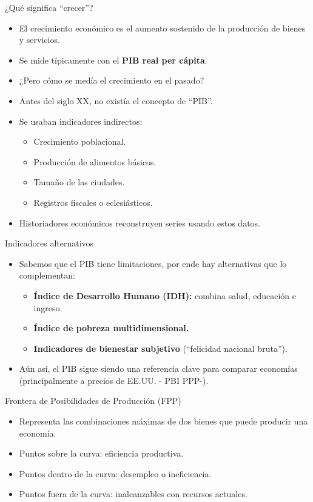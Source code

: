 \documentclass{beamer}
\begin{document}
\begin{frame}{¿Qué significa “crecer”?}
    \begin{itemize}
        \item El crecimiento económico es el aumento sostenido de la producción de bienes y servicios.
        \item Se mide típicamente con el \textbf{PIB real per cápita}.
        \item ¿Pero cómo se medía el crecimiento en el pasado?
        \item Antes del siglo XX, no existía el concepto de “PIB”.
        \item Se usaban indicadores indirectos: 
        \begin{itemize}
            \item Crecimiento poblacional.
            \item Producción de alimentos básicos.
            \item Tamaño de las ciudades.
            \item Registros fiscales o eclesiásticos.
        \end{itemize}
        \item Historiadores económicos reconstruyen series usando estos datos.
    \end{itemize}
\end{frame}

\begin{frame}{Indicadores alternativos}
    \begin{itemize}
        \item Sabemos que el PIB tiene limitaciones, por ende hay alternativas que lo complementan:
        \begin{itemize}
            \item \textbf{Índice de Desarrollo Humano (IDH):} combina salud, educación e ingreso.
            \item \textbf{Índice de pobreza multidimensional.}
            \item \textbf{Indicadores de bienestar subjetivo} (“felicidad nacional bruta”).
        \end{itemize}
        \item Aún así, el PIB sigue siendo una referencia clave para comparar economías (principalmente a precios de EE.UU. - PBI PPP-).
    \end{itemize}
\end{frame}

\begin{frame}{Frontera de Posibilidades de Producción (FPP)}
    \begin{itemize}
        \item Representa las combinaciones máximas de dos bienes que puede producir una economía.
        \item Puntos sobre la curva: eficiencia productiva.
        \item Puntos dentro de la curva: desempleo o ineficiencia.
        \item Puntos fuera de la curva: inalcanzables con recursos actuales.
    \end{itemize}
\end{frame}
\end{document}
